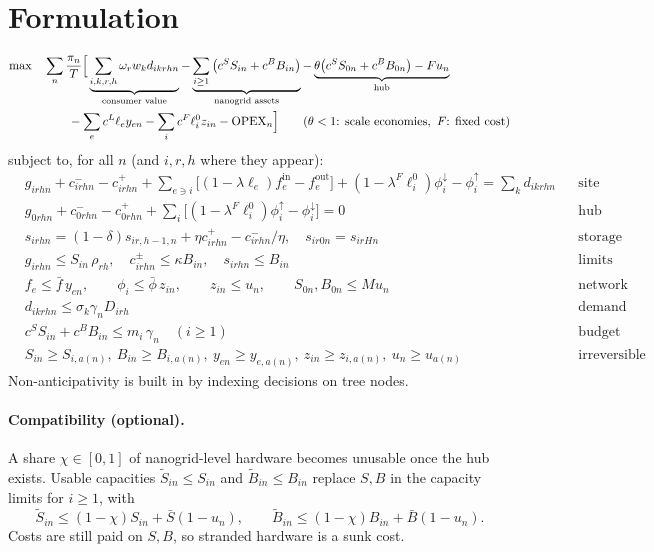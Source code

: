 \documentclass[11pt,a4paper]{article}
\begin{document}
\section{Formulation}
\begin{align}
\max\quad & \sum_{n}\frac{\pi_n}{T}\Big[\underbrace{\sum_{i,k,r,h}\omega_r w_k d_{ikrhn}}_{\text{consumer value}}
 - \underbrace{\sum_{i\ge1}\big(c^{S}S_{in}+c^{B}B_{in}\big)}_{\text{nanogrid assets}}
 - \underbrace{\theta\big(c^{S}S_{0n}+c^{B}B_{0n}\big)-F u_n}_{\text{hub}} \notag\\
 &\qquad - \sum_{e}c^{L}\ell_e y_{en}-\sum_i c^{F}\ell^{0}_i z_{in} - \text{OPEX}_n\Big]
 \qquad(\theta<1\text{: scale economies},\ F\text{: fixed cost}) \label{obj}
\end{align}
subject to, for all $n$ (and $i,r,h$ where they appear):
\begin{align}
& g_{irhn}+c^{-}_{irhn}-c^{+}_{irhn}
  +\!\!\sum_{e\ni i}\!\big[(1-\lambda\ell_e)f^{\text{in}}_{e}-f^{\text{out}}_{e}\big]
  +(1-\lambda^{F}\ell^{0}_i)\phi^{\downarrow}_{i}-\phi^{\uparrow}_{i}=\sum_k d_{ikrhn}
  && \text{site balance}\label{bal}\\
& g_{0rhn}+c^{-}_{0rhn}-c^{+}_{0rhn}+\sum_i\big[(1-\lambda^{F}\ell^{0}_i)\phi^{\uparrow}_{i}-\phi^{\downarrow}_{i}\big]=0
  && \text{hub balance}\\
& s_{irhn}=(1-\delta)s_{ir,h-1,n}+\eta c^{+}_{irhn}-c^{-}_{irhn}/\eta,\quad s_{ir0n}=s_{irHn}
  && \text{storage}\\
& g_{irhn}\le S_{in}\,\rho_{rh},\quad c^{\pm}_{irhn}\le\kappa B_{in},\quad s_{irhn}\le B_{in}
  && \text{limits}\\
& f_e\le\bar f\,y_{en},\qquad \phi_i\le\bar\phi\,z_{in},\qquad z_{in}\le u_n,\qquad S_{0n},B_{0n}\le M u_n
  && \text{network}\\
& d_{ikrhn}\le\sigma_k\gamma_nD_{irh}
  && \text{demand}\\
& c^{S}S_{in}+c^{B}B_{in}\le m_i\,\gamma_n\quad(i\ge1)
  && \text{budget}\label{bud}\\
& S_{in}\ge S_{i,a(n)},\ B_{in}\ge B_{i,a(n)},\ y_{en}\ge y_{e,a(n)},\ z_{in}\ge z_{i,a(n)},\ u_n\ge u_{a(n)}
  && \text{irreversible}\label{irr}
\end{align}
Non-anticipativity is built in by indexing decisions on tree nodes.

\paragraph{Compatibility (optional).} A share $\chi\in[0,1]$ of nanogrid-level hardware becomes
unusable once the hub exists. Usable capacities $\tilde S_{in}\le S_{in}$ and
$\tilde B_{in}\le B_{in}$ replace $S,B$ in the capacity limits for $i\ge1$, with
\[
\tilde S_{in}\le(1-\chi)S_{in}+\bar S(1-u_n),\qquad \tilde B_{in}\le(1-\chi)B_{in}+\bar B(1-u_n).
\]
Costs are still paid on $S,B$, so stranded hardware is a sunk cost.
\end{document}
